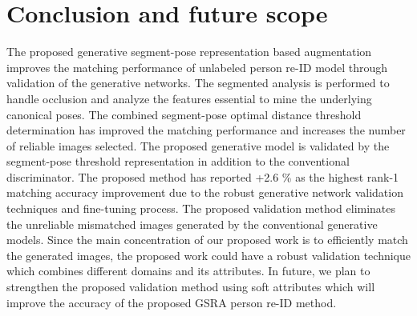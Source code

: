 \documentclass[preprint,12pt]{elsarticle}
\begin{document}

\section{Conclusion and future scope}

The proposed generative segment-pose representation based augmentation improves the matching performance of unlabeled person re-ID model through validation of the generative networks. The segmented analysis is performed to handle occlusion and analyze the features essential to mine the underlying canonical poses. The combined segment-pose optimal distance threshold determination has improved the matching performance and increases the number of reliable images selected. The proposed generative model is validated by the segment-pose threshold representation in addition to the conventional discriminator. The proposed method has reported +2.6 \% as the highest rank-1 matching accuracy improvement due to the robust generative network validation techniques and fine-tuning process. The proposed validation method eliminates the unreliable mismatched images generated by the conventional generative models. Since the main concentration of our proposed work is to efficiently match the generated images, the proposed work could have a robust validation technique which combines different domains and its attributes. In future, we plan to strengthen the proposed validation method using soft attributes which will improve the accuracy of the proposed GSRA person re-ID method. \par 




\end{document}

